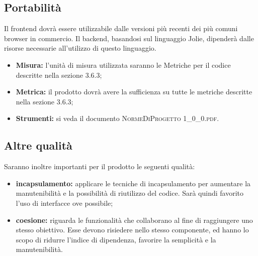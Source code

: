 	\subsection{Portabilità}
		Il frontend dovrà essere utilizzabile dalle versioni più recenti dei più comuni browser in commercio. 
		Il backend, basandosi sul linguaggio Jolie, dipenderà dalle risorse necessarie all’utilizzo di questo linguaggio.
		
		\begin{itemize}
			\item \textbf{Misura: }l’unità di misura utilizzata saranno le Metriche per il codice descritte nella sezione 3.6.3;
			\item \textbf{Metrica: }il prodotto dovrà avere la sufficienza su tutte le metriche descritte nella sezione 3.6.3;
			\item \textbf{Strumenti: }si veda il documento \textsc{NormeDiProgetto 1\_0\_0.pdf}.
			
		\end{itemize}
	
	\subsection{Altre qualità}
		Saranno inoltre importanti per il prodotto le seguenti qualità:
		
		\begin{itemize}
			\item \textbf{incapsulamento: }applicare le tecniche di incapsulamento per aumentare la manutenibilità
			e la possibilità di riutilizzo del codice. Sarà quindi favorito l’uso di interfacce ove
			possibile;
			\item \textbf{coesione: }riguarda le funzionalità che collaborano al fine di raggiungere uno stesso obiettivo. Esse devono risiedere nello stesso componente, ed hanno lo scopo di ridurre l’indice di dipendenza, favorire la semplicità e la manutenibilità.
			
		\end{itemize}
		
	
	
	